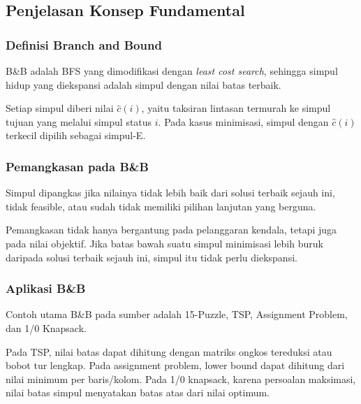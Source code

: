 \subsection{Penjelasan Konsep Fundamental}
\subsubsection{Definisi Branch and Bound}
\begin{jawab}
B\&B adalah BFS yang dimodifikasi dengan \textit{least cost search}, sehingga simpul hidup yang diekspansi adalah simpul dengan nilai batas terbaik.
\end{jawab}

Setiap simpul diberi nilai $\hat{c}(i)$, yaitu taksiran lintasan termurah ke simpul tujuan yang melalui simpul status $i$. Pada kasus minimisasi, simpul dengan $\hat{c}(i)$ terkecil dipilih sebagai simpul-E.

\subsubsection{Pemangkasan pada B\&B}
\begin{jawab}
Simpul dipangkas jika nilainya tidak lebih baik dari solusi terbaik sejauh ini, tidak feasible, atau sudah tidak memiliki pilihan lanjutan yang berguna.
\end{jawab}

Pemangkasan tidak hanya bergantung pada pelanggaran kendala, tetapi juga pada nilai objektif. Jika batas bawah suatu simpul minimisasi lebih buruk daripada solusi terbaik sejauh ini, simpul itu tidak perlu diekspansi.

\subsubsection{Aplikasi B\&B}
\begin{jawab}
Contoh utama B\&B pada sumber adalah 15-Puzzle, TSP, Assignment Problem, dan 1/0 Knapsack.
\end{jawab}

Pada TSP, nilai batas dapat dihitung dengan matriks ongkos tereduksi atau bobot tur lengkap. Pada assignment problem, lower bound dapat dihitung dari nilai minimum per baris/kolom. Pada 1/0 knapsack, karena persoalan maksimasi, nilai batas simpul menyatakan batas atas dari nilai optimum.

